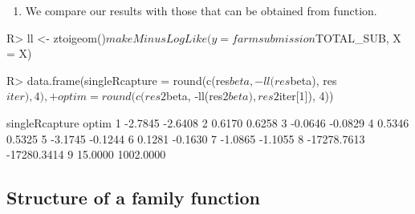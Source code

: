 \documentclass[
]{jss}
\providecommand{\tightlist}{%
  \setlength{\itemsep}{0pt}\setlength{\parskip}{0pt}}
\newcommand{\1}{\mathcal{I}} \newcommand{\bZero}{\boldsymbol{0}}
\begin{document}
\begin{enumerate}
\def\labelenumi{\arabic{enumi}.}
\setcounter{enumi}{4}
\tightlist
\item
  We compare our results with those that can be obtained from
   function.
\end{enumerate}

\begin{CodeChunk}
\begin{CodeInput}
R> ll <- ztoigeom()$makeMinusLogLike(y = farmsubmission$TOTAL_SUB, X = X)
\end{CodeInput}
\end{CodeChunk}

\begin{CodeChunk}
\end{CodeChunk}

\begin{CodeChunk}
\begin{CodeInput}
R> data.frame(singleRcapture = round(c(res$beta, -ll(res$beta), res$iter), 4),
+            optim = round(c(res2$beta, -ll(res2$beta), res2$iter[1]), 4))
\end{CodeInput}
\begin{CodeOutput}
  singleRcapture       optim
1        -2.7845     -2.6408
2         0.6170      0.6258
3        -0.0646     -0.0829
4         0.5346      0.5325
5        -3.1745     -0.1244
6         0.1281     -0.1630
7        -1.0865     -1.1055
8    -17278.7613 -17280.3414
9        15.0000   1002.0000
\end{CodeOutput}
\end{CodeChunk}

\subsection{Structure of a family function}\label{sec-family}
\end{document}
